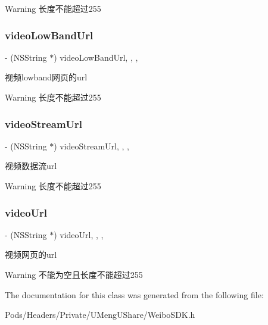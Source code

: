 \begin{DoxyWarning}{Warning}
长度不能超过255 
\end{DoxyWarning}
\mbox{\label{interface_w_b_video_object_a931e254c3abc980ec91cc17591ac8b4c}} 
\subsubsection{\texorpdfstring{video\+Low\+Band\+Url}{videoLowBandUrl}}
{\footnotesize\ttfamily -\/ (N\+S\+String $\ast$) video\+Low\+Band\+Url\hspace{0.3cm}{\ttfamily [read]}, {\ttfamily [write]}, {\ttfamily [nonatomic]}, {\ttfamily [strong]}}

视频lowband网页的url

\begin{DoxyWarning}{Warning}
长度不能超过255 
\end{DoxyWarning}
\mbox{\label{interface_w_b_video_object_a7de33ecf1ce49fa87c4bd98bead6a792}} 
\subsubsection{\texorpdfstring{video\+Stream\+Url}{videoStreamUrl}}
{\footnotesize\ttfamily -\/ (N\+S\+String $\ast$) video\+Stream\+Url\hspace{0.3cm}{\ttfamily [read]}, {\ttfamily [write]}, {\ttfamily [nonatomic]}, {\ttfamily [strong]}}

视频数据流url

\begin{DoxyWarning}{Warning}
长度不能超过255 
\end{DoxyWarning}
\mbox{\label{interface_w_b_video_object_a30184590a410ae74ac64a31d156e1c66}} 
\subsubsection{\texorpdfstring{video\+Url}{videoUrl}}
{\footnotesize\ttfamily -\/ (N\+S\+String $\ast$) video\+Url\hspace{0.3cm}{\ttfamily [read]}, {\ttfamily [write]}, {\ttfamily [nonatomic]}, {\ttfamily [strong]}}

视频网页的url

\begin{DoxyWarning}{Warning}
不能为空且长度不能超过255 
\end{DoxyWarning}


The documentation for this class was generated from the following file\+:\begin{DoxyCompactItemize}
\item 
Pods/\+Headers/\+Private/\+U\+Meng\+U\+Share/Weibo\+S\+D\+K.\+h\end{DoxyCompactItemize}

